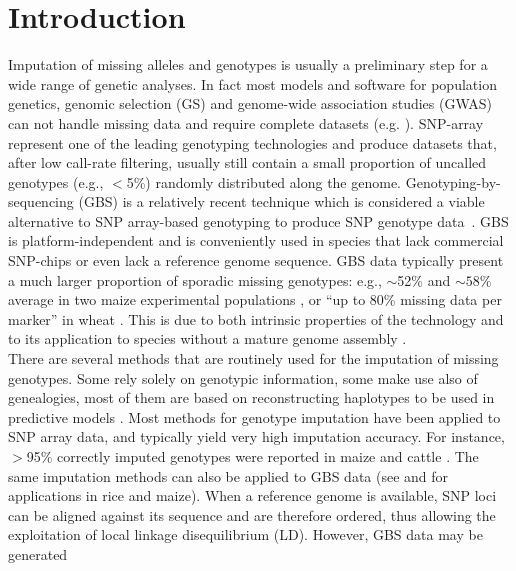\section{Introduction}
\label{intro}

Imputation of missing alleles and genotypes is usually a preliminary step for
a wide range of genetic analyses. In fact most models and software for 
population genetics, genomic selection (GS) and genome-wide association 
studies (GWAS) can not handle missing data and require complete datasets (e.g. \cite{hayes2009invited,aulchenko2007genabel,endelman2011rrblup,perez2014genome}). 
SNP-array represent one of the leading genotyping technologies and produce 
datasets that, after low call-rate filtering, 
usually still contain a small proportion of uncalled genotypes (e.g., $<$5\%) 
randomly distributed along the genome. Genotyping-by-sequencing (GBS) is a 
relatively recent technique which is considered a viable alternative to SNP array-based genotyping to produce SNP genotype data~\cite{elshire_robust_2011}.
GBS is platform-independent and is conveniently 
used in species that lack commercial SNP-chips or even lack a reference 
genome sequence. GBS data typically present a much larger proportion of 
sporadic missing genotypes: e.g., $\sim$52\% and $\sim 58\%$ average in two maize experimental populations \cite{crossa_genomic_2013},
or ``up to 80\% missing data per marker'' in wheat \cite{poland_genomic_2012}. This 
is due to both intrinsic properties of the technology
and to its application to species without a mature genome assembly \cite{glaubitz_tassel-gbs:_2014}.\\
There are several methods that are routinely used for the imputation of 
missing genotypes. Some rely solely on genotypic information, some make 
use also of genealogies, most of them are based on reconstructing haplotypes 
to be used in predictive models \cite{nicolazzi_software_2015}. Most methods for 
genotype imputation have been applied to SNP array data, and typically 
yield very high imputation accuracy. For instance, $>$95\% correctly imputed 
genotypes were reported in maize \cite{hickey_factors_2012} and cattle \cite{vanraden_genomic_2011}. 
The same imputation methods can also be applied to GBS data (see \cite{huang_efficient_2014} and \cite{swarts_novel_2014} for applications in rice and maize). When a reference 
genome is available, SNP loci can be aligned against its sequence and 
are therefore ordered, thus allowing the exploitation of local linkage disequilibrium (LD).
However, GBS data may be generated 
